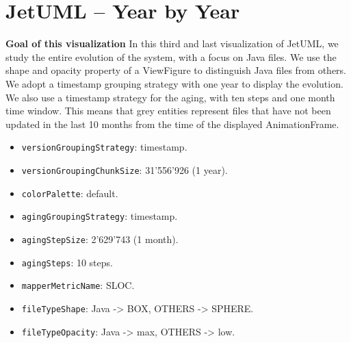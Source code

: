 \section{JetUML – Year by Year}
\textbf{Goal of this visualization}
In this third and last visualization of JetUML, we study the entire evolution of the system, with a focus on Java files. 
We use the shape and opacity property of a ViewFigure to distinguish Java files from others.
We adopt a timestamp grouping strategy with one year to display the evolution. We also use a timestamp strategy for the aging, with ten steps and one month time window. This means that grey entities represent files that have not been updated in the last 10 months from the time of the displayed AnimationFrame. 
\begin{itemize}
    \item \texttt{versionGroupingStrategy}: timestamp.
    \item \texttt{versionGroupingChunkSize}: 31'556'926 (1 year). 
    \item \texttt{colorPalette}: default.
    \item \texttt{agingGroupingStrategy}: timestamp.
    \item \texttt{agingStepSize}: 2'629'743 (1 month).
    \item \texttt{agingSteps}: 10 steps. 
    \item \texttt{mapperMetricName}: SLOC. 
    \item \texttt{fileTypeShape}: Java -> BOX, OTHERS -> SPHERE. 
    \item \texttt{fileTypeOpacity}: Java -> max, OTHERS -> low. 
\end{itemize}

